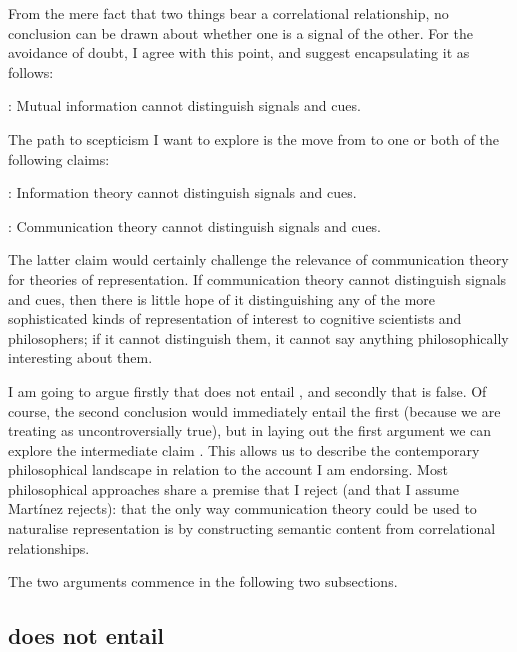 From the mere fact that two things bear a correlational relationship, no conclusion can be drawn about whether one is a signal of the other.
For the avoidance of doubt, I agree with this point, and suggest encapsulating it as follows:

\begin{myquote}
\ami: Mutual information cannot distinguish signals and cues.
\end{myquote}

\noindent The path to scepticism I want to explore is the move from \ami{} to one or both of the following claims:

\begin{myquote}
\ait: Information theory cannot distinguish signals and cues.
\end{myquote}

\begin{myquote}
\act: Communication theory cannot distinguish signals and cues.
\end{myquote}

\noindent The latter claim would certainly challenge the relevance of communication theory for theories of representation.
If communication theory cannot distinguish signals and cues, then there is little hope of it distinguishing any of the more sophisticated kinds of representation of interest to cognitive scientists and philosophers; if it cannot distinguish them, it cannot say anything philosophically interesting about them.

I am going to argue firstly that \ami{} does not entail \act{}, and secondly that \act{} is false.
Of course, the second conclusion would immediately entail the first (because we are treating \ami{} as uncontroversially true), but in laying out the first argument we can explore the intermediate claim \ait{}.
This allows us to describe the contemporary philosophical landscape in relation to the account I am endorsing.
Most philosophical approaches share a premise that I reject (and that I assume Mart\'{i}nez rejects): that the only way communication theory could be used to naturalise representation is by constructing semantic content from correlational relationships.

The two arguments commence in the following two subsections.

\subsection{\sloppy \ami{} does not entail \act{}}

